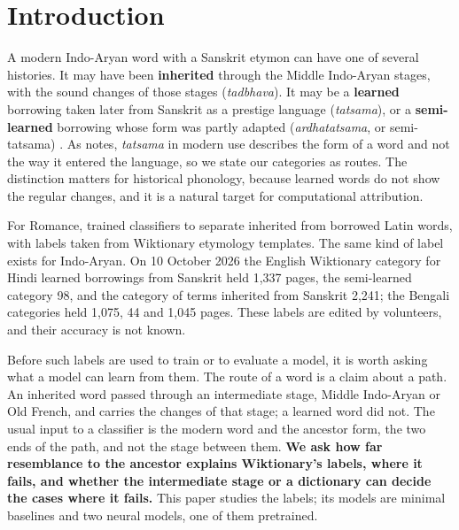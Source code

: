 \documentclass[11pt]{article}
\begin{document}
\section{Introduction}

A modern Indo-Aryan word with a Sanskrit etymon can have one of several histories. It may have been \textbf{inherited} through the Middle Indo-Aryan stages, with the sound changes of those stages (\textit{tadbhava}). It may be a \textbf{learned} borrowing taken later from Sanskrit as a prestige language (\textit{tatsama}), or a \textbf{semi-learned} borrowing whose form was partly adapted (\textit{ardhatatsama}, or semi-tatsama) \citep[\S111]{chatterji1926}. As \citeauthor{chatterji1926} notes, \textit{tatsama} in modern use describes the form of a word and not the way it entered the language, so we state our categories as routes. The distinction matters for historical phonology, because learned words do not show the regular changes, and it is a natural target for computational attribution.

For Romance, \citet{cristea2021inherited} trained classifiers to separate inherited from borrowed Latin words, with labels taken from Wiktionary etymology templates. The same kind of label exists for Indo-Aryan. On 10 October 2026 the English Wiktionary category for Hindi learned borrowings from Sanskrit held 1,337 pages, the semi-learned category 98, and the category of terms inherited from Sanskrit 2,241; the Bengali categories held 1,075, 44 and 1,045 pages. These labels are edited by volunteers, and their accuracy is not known.

Before such labels are used to train or to evaluate a model, it is worth asking what a model can learn from them. The route of a word is a claim about a path. An inherited word passed through an intermediate stage, Middle Indo-Aryan or Old French, and carries the changes of that stage; a learned word did not. The usual input to a classifier is the modern word and the ancestor form, the two ends of the path, and not the stage between them. \textbf{We ask how far resemblance to the ancestor explains Wiktionary's labels, where it fails, and whether the intermediate stage or a dictionary can decide the cases where it fails.} This paper studies the labels; its models are minimal baselines and two neural models, one of them pretrained.
\end{document}
